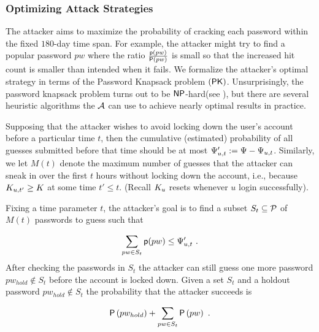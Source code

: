 \subsubsection{Optimizing Attack Strategies} %
The attacker aims to maximize the probability of cracking each password within the fixed $180$-day time span. For example, the attacker might try to find a popular password $pw$ where the ratio $\frac{\textsf{p}(pw)}{\mathsf{P}\left(pw\right)}$ is small so that the increased hit count is smaller than intended when it fails. We formalize the attacker's optimal strategy in terms of the \textsf{Password Knapsack} problem $(\mathsf{PK})$. Unsurprisingly, the password knapsack problem turns out to be $\mathsf{NP}$-hard(see ), but there are several heuristic algorithms the $\mathcal{A}$ can use to achieve nearly optimal results in practice. 





Supposing that the attacker wishes to avoid locking down the user's account before a particular time $t$, then the cumulative (estimated) probability of all guesses submitted before that time should be at most $\Psi_{u,t}':=\Psi- \Psi_{u,t}$. Similarly, we let $M(t)$ denote the maximum number of guesses that the attacker can sneak in over the first $t$ hours without locking down the account, i.e., because $K_{u,t'}  \geq K$ at some time $t' \leq t$. (Recall $K_u$ resets whenever $u$ login successfully). 



Fixing a time parameter $t$, the attacker’s goal is to find a subset $S_t \subseteq \mathcal{P}$ of $M(t)$ passwords to guess such that 



\begin{equation} \label{eq:attackerConstraint}
\vspace{-0.25cm} 
\sum_{pw \in S_t} \EstP{pw} \leq \hitCountThresholdOfU{u,t}' \ .
\end{equation}
After checking the passwords in $S_t$ the attacker can still guess one more password $pw_{hold} \not\in S_t$ before the account is locked down. Given a set $S_t$ and a holdout password $pw_{hold} \not\in S_t$ the probability that the attacker succeeds is 

\begin{equation}\vspace{-0.1cm} \label{eq:attackerSuccess} \TrueP{pw_{hold}} + \sum_{pw \in S_t}\TrueP{pw} \ . \vspace{-0.1cm} \end{equation}

